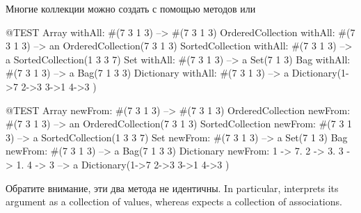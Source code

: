 \documentclass[a4paper,10pt,twoside]{book}
\begin{document}
Многие коллекции можно создать с помощью методов  или 

\begin{code}{@TEST}
Array withAll: #(7 3 1 3)                      --> #(7 3 1 3)
OrderedCollection withAll: #(7 3 1 3) --> an OrderedCollection(7 3 1 3)
SortedCollection withAll: #(7 3 1 3)    --> a SortedCollection(1 3 3 7)
Set withAll: #(7 3 1 3)                         --> a Set(7 1 3)
Bag withAll: #(7 3 1 3)                        --> a Bag(7 1 3 3)
Dictionary withAll: #(7 3 1 3)               --> a Dictionary(1->7 2->3 3->1 4->3 )
\end{code}

\begin{code}{@TEST}
Array newFrom: #(7 3 1 3)                                          --> #(7 3 1 3)
OrderedCollection newFrom: #(7 3 1 3)                     --> an OrderedCollection(7 3 1 3)
SortedCollection newFrom: #(7 3 1 3)                       --> a SortedCollection(1 3 3 7)
Set newFrom: #(7 3 1 3)                                            --> a Set(7 1 3)
Bag newFrom: #(7 3 1 3)                                           --> a Bag(7 1 3 3)
Dictionary newFrom: {1 -> 7. 2 -> 3. 3 -> 1. 4 -> 3} --> a Dictionary(1->7 2->3 3->1 4->3 )
\end{code}
\noindent
Обратите внимание, эти два метода не идентичны.
In particular,  interprets its argument as a collection of values, whereas  expects a collection of associations.

\end{document}
